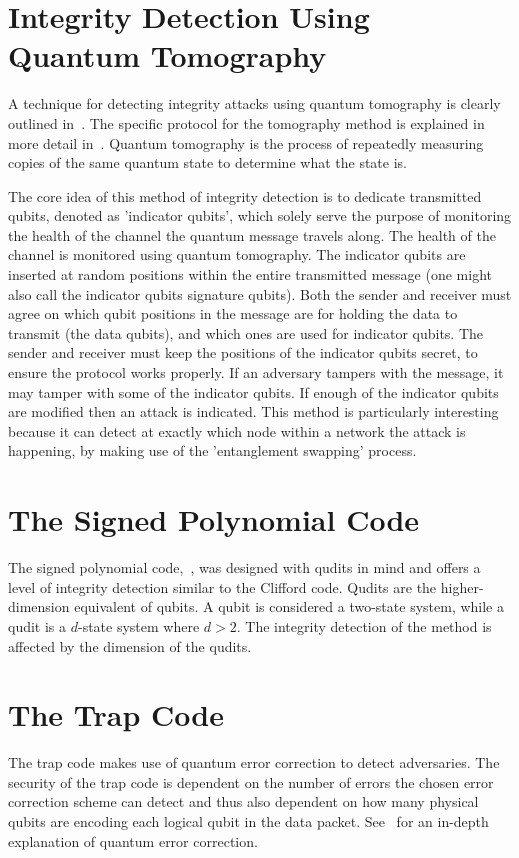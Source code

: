 \section{Integrity Detection Using Quantum Tomography}
\label{subsec:IntegrityDetectionUsingQuantumTomography}
A technique for detecting integrity attacks using quantum tomography is clearly outlined in~\cite{satoh2018network}. The specific protocol for the tomography method is explained in more detail in~\cite{oka2016classical}. Quantum tomography is the process of repeatedly measuring copies of the same quantum state to determine what the state is.

The core idea of this method of integrity detection is to dedicate transmitted qubits, denoted as 'indicator qubits', which solely serve the purpose of monitoring the health of the channel the quantum message travels along. The health of the channel is monitored using quantum tomography. The indicator qubits are inserted at random positions within the entire transmitted message (one might also call the indicator qubits signature qubits). Both the sender and receiver must agree on which qubit positions in the message are for holding the data to transmit (the data qubits), and which ones are used for indicator qubits. The sender and receiver must keep the positions of the indicator qubits secret, to ensure the protocol works properly. If an adversary tampers with the message, it may tamper with some of the indicator qubits. If enough of the indicator qubits are modified then an attack is indicated. This method is particularly interesting because it can detect at exactly which node within a network the attack is happening, by making use of the 'entanglement swapping' process.
\section{The Signed Polynomial Code}
\label{section:signedPolynomialCode}
The signed polynomial code,~\cite{ben2006secure,aharonov2017interactive}, was designed with qudits in mind and offers a level of integrity detection similar to the Clifford code. Qudits are the higher-dimension equivalent of qubits. A qubit is considered a two-state system, while a qudit is a $d$-state system where $d > 2$. The integrity detection of the method is affected by the dimension of the qudits.
\section{The Trap Code}
The trap code makes use of quantum error correction to detect adversaries. The security of the trap code is dependent on the number of errors the chosen error correction scheme can detect and thus also dependent on how many physical qubits are encoding each logical qubit in the data packet. See~\cite{nielsen2002quantum} for an in-depth explanation of quantum error correction.


